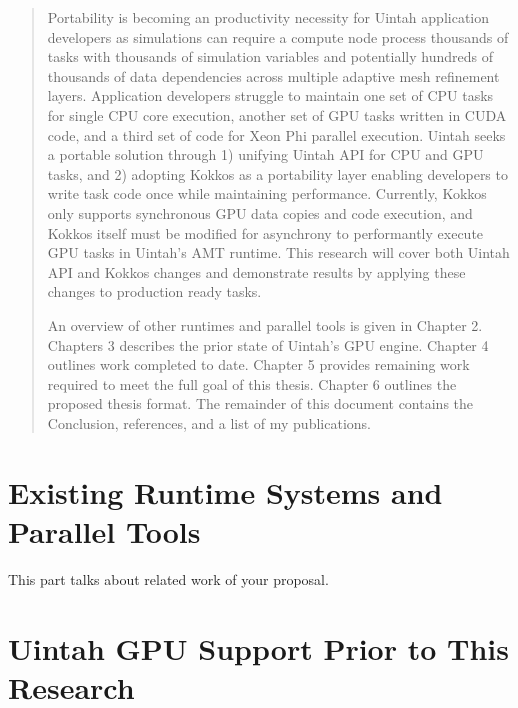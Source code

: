 \documentclass[12pt]{article}
\begin{document}
\begin{abstract}
Portability is becoming an productivity necessity for Uintah application developers as simulations can require a compute node process thousands of tasks with thousands of simulation variables and potentially hundreds of thousands of data dependencies across multiple adaptive mesh refinement layers.  Application developers struggle to maintain one set of CPU tasks for single CPU core execution, another set of GPU tasks written in CUDA code, and a third set of code for Xeon Phi parallel execution.  Uintah seeks a portable solution through 1) unifying Uintah API for CPU and GPU tasks, and 2) adopting Kokkos as a portability layer enabling developers to write task code once while maintaining performance. Currently, Kokkos only supports synchronous GPU data copies and code execution, and Kokkos itself must be modified for asynchrony to performantly execute GPU tasks in Uintah's AMT runtime.  This research will cover both Uintah API and Kokkos changes and demonstrate results by applying these changes to production ready tasks.  
   
An overview of other runtimes and parallel tools is given in Chapter 2.  Chapters 3 describes the prior state of Uintah’s GPU engine.  Chapter 4 outlines work completed to date.  Chapter 5 provides remaining work required to meet the full goal of this thesis.  Chapter 6 outlines the proposed thesis format.  The remainder of this document contains the Conclusion, references, and a list of my publications.   

\end{abstract}

\pagebreak
\tableofcontents
\pagebreak

\cleardoublepage
{}




\section{Existing Runtime Systems and Parallel Tools}
\label{ch:related}


This part talks about related work of your proposal.

\section{Uintah GPU Support Prior to This Research}
\label{ch:proposal}
\end{document}

